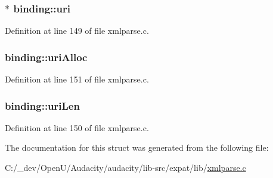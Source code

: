 \subsubsection[{\texorpdfstring{uri}{uri}}]{$\ast$ binding\+::uri}\hypertarget{structbinding_a4d6ad4c6a6ce3415ba75b719f404d1db}{}\label{structbinding_a4d6ad4c6a6ce3415ba75b719f404d1db}


Definition at line 149 of file xmlparse.\+c.

\subsubsection[{\texorpdfstring{uri\+Alloc}{uriAlloc}}]{ binding\+::uri\+Alloc}\hypertarget{structbinding_ae35a6d0491a565baa5648102a33aeef8}{}\label{structbinding_ae35a6d0491a565baa5648102a33aeef8}


Definition at line 151 of file xmlparse.\+c.

\subsubsection[{\texorpdfstring{uri\+Len}{uriLen}}]{ binding\+::uri\+Len}\hypertarget{structbinding_ad48e2bfeac05e47551507fe035c94569}{}\label{structbinding_ad48e2bfeac05e47551507fe035c94569}


Definition at line 150 of file xmlparse.\+c.



The documentation for this struct was generated from the following file\+:\begin{DoxyCompactItemize}
\item 
C\+:/\+\_\+dev/\+Open\+U/\+Audacity/audacity/lib-\/src/expat/lib/\hyperlink{xmlparse_8c}{xmlparse.\+c}\end{DoxyCompactItemize}

